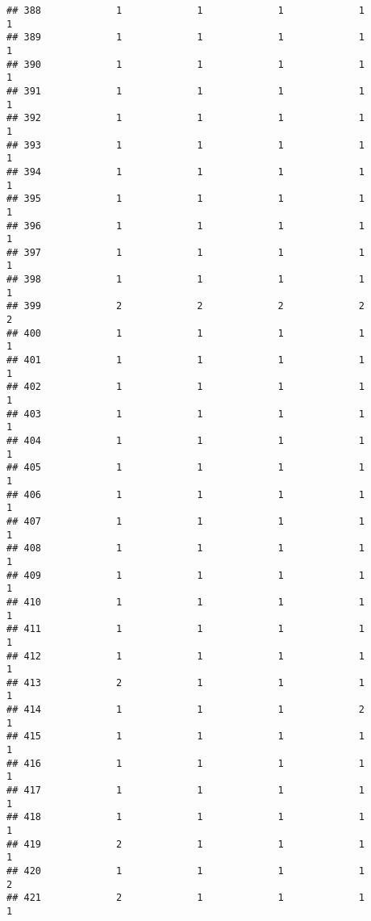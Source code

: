 \documentclass[
]{article}
\begin{document}
\begin{verbatim}
## 388             1             1             1             1             1
## 389             1             1             1             1             1
## 390             1             1             1             1             1
## 391             1             1             1             1             1
## 392             1             1             1             1             1
## 393             1             1             1             1             1
## 394             1             1             1             1             1
## 395             1             1             1             1             1
## 396             1             1             1             1             1
## 397             1             1             1             1             1
## 398             1             1             1             1             1
## 399             2             2             2             2             2
## 400             1             1             1             1             1
## 401             1             1             1             1             1
## 402             1             1             1             1             1
## 403             1             1             1             1             1
## 404             1             1             1             1             1
## 405             1             1             1             1             1
## 406             1             1             1             1             1
## 407             1             1             1             1             1
## 408             1             1             1             1             1
## 409             1             1             1             1             1
## 410             1             1             1             1             1
## 411             1             1             1             1             1
## 412             1             1             1             1             1
## 413             2             1             1             1             1
## 414             1             1             1             2             1
## 415             1             1             1             1             1
## 416             1             1             1             1             1
## 417             1             1             1             1             1
## 418             1             1             1             1             1
## 419             2             1             1             1             1
## 420             1             1             1             1             2
## 421             2             1             1             1             1

\end{verbatim}
\end{document}
